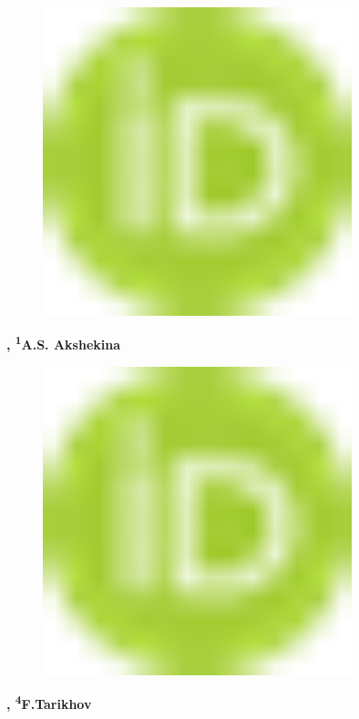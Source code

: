 \begin{figure}[H]
	\centering
	\includegraphics[width=0.8\textwidth]{media/chem2/image1}
	\caption*{}
\end{figure}
{\bfseries ,
\textsuperscript{1}A.S. Akshekina}

\begin{figure}[H]
	\centering
	\includegraphics[width=0.8\textwidth]{media/chem2/image1}
	\caption*{}
\end{figure}
{\bfseries ,
\textsuperscript{4}F.Tarikhov}

